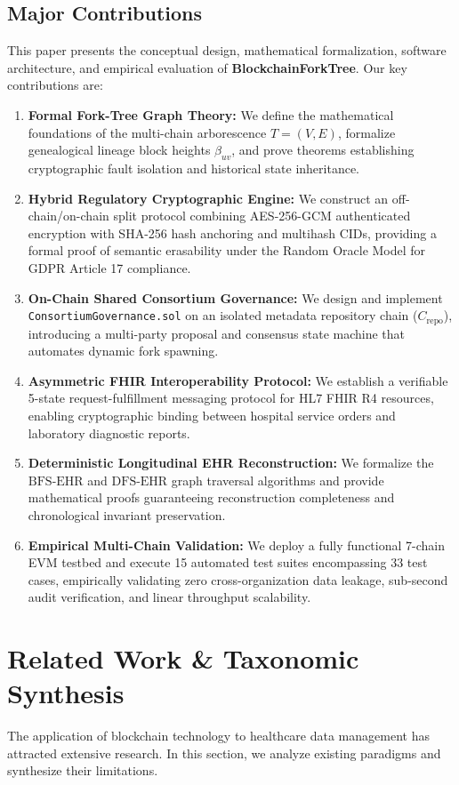 \documentclass[journal]{IEEEtran}
\theoremstyle{definition}
\begin{document}
\subsection{Major Contributions}
This paper presents the conceptual design, mathematical formalization, software architecture, and empirical evaluation of \textbf{BlockchainForkTree}. Our key contributions are:
\begin{enumerate}
    \item \textbf{Formal Fork-Tree Graph Theory:} We define the mathematical foundations of the multi-chain arborescence $T = (V, E)$, formalize genealogical lineage block heights $\beta_{uv}$, and prove theorems establishing cryptographic fault isolation and historical state inheritance.
    \item \textbf{Hybrid Regulatory Cryptographic Engine:} We construct an off-chain/on-chain split protocol combining AES-256-GCM authenticated encryption with SHA-256 hash anchoring and multihash CIDs, providing a formal proof of semantic erasability under the Random Oracle Model for GDPR Article 17 compliance.
    \item \textbf{On-Chain Shared Consortium Governance:} We design and implement \texttt{ConsortiumGovernance.sol} on an isolated metadata repository chain ($C_{\text{repo}}$), introducing a multi-party proposal and consensus state machine that automates dynamic fork spawning.
    \item \textbf{Asymmetric FHIR Interoperability Protocol:} We establish a verifiable 5-state request-fulfillment messaging protocol for HL7 FHIR R4 resources, enabling cryptographic binding between hospital service orders and laboratory diagnostic reports.
    \item \textbf{Deterministic Longitudinal EHR Reconstruction:} We formalize the $\text{BFS-EHR}$ and $\text{DFS-EHR}$ graph traversal algorithms and provide mathematical proofs guaranteeing reconstruction completeness and chronological invariant preservation.
    \item \textbf{Empirical Multi-Chain Validation:} We deploy a fully functional 7-chain EVM testbed and execute 15 automated test suites encompassing 33 test cases, empirically validating zero cross-organization data leakage, sub-second audit verification, and linear throughput scalability.
\end{enumerate}

\section{Related Work \& Taxonomic Synthesis}
The application of blockchain technology to healthcare data management has attracted extensive research. In this section, we analyze existing paradigms and synthesize their limitations.
\end{document}
